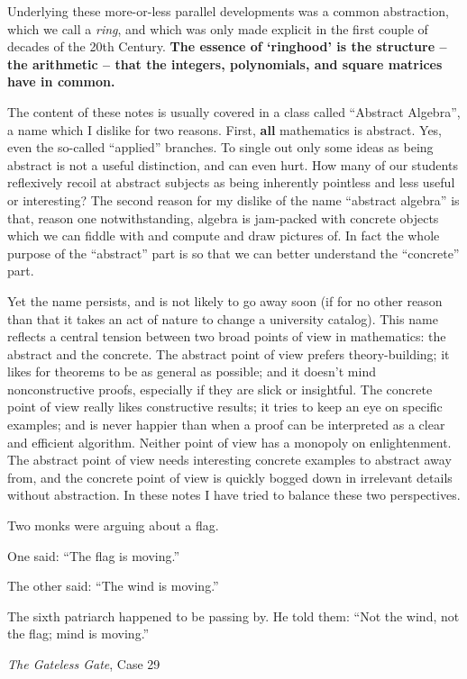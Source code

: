 Underlying these more-or-less parallel developments was a common abstraction, which we call a \emph{ring}, and which was only made explicit in the first couple of decades of the 20th Century.
\textbf{The essence of `ringhood' is the structure -- the arithmetic -- that the integers, polynomials, and square matrices have in common.}

The content of these notes is usually covered in a class called ``Abstract Algebra'', a name which I dislike for two reasons.
First, \textbf{all} mathematics is abstract.
Yes, even the so-called ``applied'' branches.
To single out only some ideas as being abstract is not a useful distinction, and can even hurt.
How many of our students reflexively recoil at abstract subjects as being inherently pointless and less useful or interesting?
The second reason for my dislike of the name ``abstract algebra'' is that, reason one notwithstanding, algebra is jam-packed with concrete objects which we can fiddle with and compute and draw pictures of.
In fact the whole purpose of the ``abstract'' part is so that we can better understand the ``concrete'' part.

Yet the name persists, and is not likely to go away soon (if for no other reason than that it takes an act of nature to change a university catalog).
This name reflects a central tension between two broad points of view in mathematics: the abstract and the concrete.
The abstract point of view prefers theory-building; it likes for theorems to be as general as possible; and it doesn't mind nonconstructive proofs, especially if they are slick or insightful.
The concrete point of view really likes constructive results; it tries to keep an eye on specific examples; and is never happier than when a proof can be interpreted as a clear and efficient algorithm.
Neither point of view has a monopoly on enlightenment.
The abstract point of view needs interesting concrete examples to abstract away from, and the concrete point of view is quickly bogged down in irrelevant details without abstraction.
In these notes I have tried to balance these two perspectives.

\begin{center}
\begin{minipage}{0.7\textwidth}
Two monks were arguing about a flag.

One said: ``The flag is moving.''

The other said: ``The wind is moving.''

The sixth patriarch happened to be passing by. He told them: ``Not the wind, not the flag; mind is moving.''

\hfill \emph{The Gateless Gate}, Case 29
\end{minipage}
\end{center}
